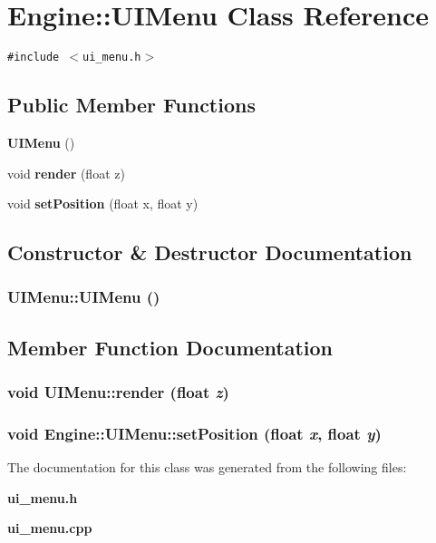 \section{Engine::UIMenu Class Reference}
\label{classEngine_1_1UIMenu}
{\tt \#include $<$ui\_\-menu.h$>$}

\subsection*{Public Member Functions}
\begin{CompactItemize}
\item 
{\bf UIMenu} ()
\item 
void {\bf render} (float z)
\item 
void {\bf setPosition} (float x, float y)
\end{CompactItemize}


\subsection{Constructor \& Destructor Documentation}
\subsubsection{\setlength{\rightskip}{0pt plus 5cm}UIMenu::UIMenu ()}\label{classEngine_1_1UIMenu_4a56921665ec80155aaa0b2c7b6c6d01}




\subsection{Member Function Documentation}
\subsubsection{\setlength{\rightskip}{0pt plus 5cm}void UIMenu::render (float {\em z})}\label{classEngine_1_1UIMenu_6907856e051ef716ec7b6eec6c556549}


\subsubsection{\setlength{\rightskip}{0pt plus 5cm}void Engine::UIMenu::setPosition (float {\em x}, float {\em y})\hspace{0.3cm}{\tt  [inline]}}\label{classEngine_1_1UIMenu_db7b6f9b0bf4a56a90ae54685330f7a8}




The documentation for this class was generated from the following files:\begin{CompactItemize}
\item 
{\bf ui\_\-menu.h}\item 
{\bf ui\_\-menu.cpp}\end{CompactItemize}
